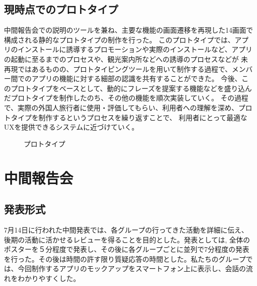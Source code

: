 \documentclass[11pt,papersize]{jsbook}
\begin{document}
\section{現時点でのプロトタイプ}\label{sec:sannosan}
 中間報告会での説明のツールを兼ね、主要な機能の画面遷移を再現した14画面で構成される静的なプロトタイプの制作を行った。
このプロトタイプでは、アプリのインストールに誘導するプロモーションや実際のインストールなど、アプリの起動に至るまでのプロセスや、観光案内所などへの誘導のプロセスなどが
未再現ではあるものの、プロトタイピングツールを用いて制作する過程で、メンバー間でのアプリの機能に対する細部の認識を共有することができた。
今後、このプロトタイプをベースとして、動的にフレーズを提案する機能などを盛り込んだプロトタイプを制作したのち、その他の機能を順次実装していく。
その過程で、実際の外国人旅行者に使用・評価してもらい、利用者への理解を深め、プロトタイプを制作するというプロセスを繰り返すことで、
利用者にとって最適なUXを提供できるシステムに近づけていく。
\begin{figure}[htbp]
 \begin{center}
 \end{center}
 \caption{プロトタイプ}
 \label{fig:prototype}
\end{figure}


\chapter{中間報告会}

\section{発表形式}
 7月14日に行われた中間発表では、各グループの行ってきた活動を詳細に伝え、後期の活動に活かせるレビューを得ることを目的とした。発表としては, 全体のポスターを５分程度で発表し、その後に各グループごとに並列で7分程度の発表を行った。その後は時間の許す限り質疑応答の時間とした。私たちのグループでは、今回制作するアプリのモックアップをスマートフォン上に表示し、会話の流れをわかりやすくした。
\end{document}
